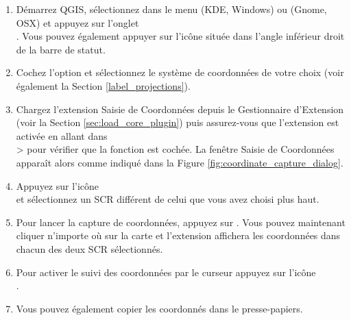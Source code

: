 \begin{enumerate}
  \item Démarrez QGIS, sélectionnez  dans le menu 
   (KDE, Windows) ou  (Gnome, OSX) 
  et appuyez sur l'onglet\\ .
  Vous pouvez également appuyer sur l'icône 
  située dans l'angle inférieur droit de la barre de statut.
  \item Cochez l'option  et
  sélectionnez le système de coordonnées de votre choix (voir également
  la Section \ref{label_projections}).
  \item Chargez l'extension Saisie de Coordonnées depuis le Gestionnaire
  d'Extension (voir la Section \ref{sec:load_core_plugin}) puis assurez-vous
  que l'extension est activée en allant dans\\  >  
  pour vérifier que la fonction  est cochée. 
   La fenêtre Saisie de Coordonnées apparaît alors comme indiqué dans 
  la Figure \ref{fig:coordinate_capture_dialog}.
  \item Appuyez sur l'icône\\  
  et sélectionnez un SCR différent de celui que vous avez choisi plus haut.
  \item Pour lancer la capture de coordonnées, appuyez sur . Vous pouvez maintenant cliquer n'importe où sur la carte et l'extension affichera les coordonnées dans chacun des deux SCR sélectionnés.
  \item Pour activer le suivi des coordonnées par le curseur appuyez sur l'icône\\ .
  \item Vous pouvez également copier les coordonnés dans le presse-papiers.
\end{enumerate}
